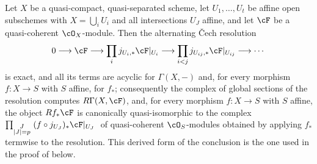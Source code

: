 \begin{lemma}\label{lem:pc-cech-resolution}
Let $X$ be a quasi-compact, quasi-separated scheme, let
$U_1,\dots,U_t$ be affine open subschemes with $X=\bigcup_iU_i$ and
all intersections $U_J$ affine, and let $\cF$ be a quasi-coherent
$\cO_X$-module.  Then the alternating Čech resolution
\[
0\longrightarrow\cF\longrightarrow\prod_i j_{U_i,*}\cF|_{U_i}
\longrightarrow\prod_{i<j}j_{U_{ij},*}\cF|_{U_{ij}}
\longrightarrow\cdots
\]
is exact, and all its terms are acyclic for $\Gamma(X,-)$ and, for
every morphism $f:X\to S$ with $S$ affine, for $f_*$; consequently the
complex of global sections of the resolution computes
$R\Gamma(X,\cF)$, and, for every morphism $f:X\to S$ with $S$ affine,
the object $Rf_*\cF$ is canonically quasi-isomorphic to the complex
$\prod_{\substack{J\\|J|=p}}\;(f\circ j_{U_J})_*\cF|_{U_J}\;$ of
quasi-coherent $\cO_S$-modules obtained by applying $f_*$ termwise to
the resolution.  This derived form of the conclusion is the one used
in the proof of  below.
\end{lemma}
